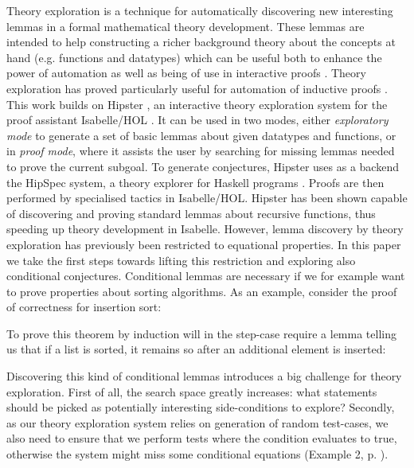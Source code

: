 \label{sec:intro}

Theory exploration is a technique for automatically discovering new interesting lemmas in a formal mathematical theory development.
%
These lemmas are intended to help constructing a richer background theory about the concepts at hand (e.g. functions and datatypes) which can be useful both to enhance the power of automation as well as being of use in interactive proofs \cite{mathsaid,isacosy,isascheme}.
%
Theory exploration has proved particularly useful for automation of inductive proofs \cite{hipspecCADE}. This work builds on Hipster \cite{hipster}, an interactive theory exploration system for the proof assistant Isabelle/HOL \cite{isabelle}.
%
It can be used in two modes, either \emph{exploratory mode} to generate a set of basic lemmas about given datatypes and functions, or in \emph{proof mode}, where it assists the user by searching for missing lemmas needed to prove the current subgoal.
%
To generate conjectures, Hipster uses as a backend the HipSpec system, a theory explorer for Haskell programs \cite{hipspecCADE}.
%
Proofs are then performed by specialised tactics in Isabelle/HOL. Hipster has been shown capable of discovering and proving standard lemmas about recursive functions, thus speeding up theory development in Isabelle.
%
However, lemma discovery by theory exploration has previously been restricted to equational properties.
%
In this paper we take the first steps towards lifting this restriction and exploring also conditional conjectures.
%
Conditional lemmas are necessary if we for example want to prove properties about sorting algorithms.
%
As an example, consider the proof of correctness for insertion sort:
%
\begin{center}
\end{center}
%
To prove this theorem by induction will in the step-case require a lemma telling us that if a list is sorted, it remains so after an additional element is inserted:
%
\begin{center}		
\end{center}
%
Discovering this kind of conditional lemmas introduces a big challenge for theory exploration.
%
First of all, the search space greatly increases: what statements should be picked as potentially interesting side-conditions to explore?
%
Secondly, as our theory exploration system relies on generation of random test-cases, we also need to ensure that we perform tests where the condition evaluates to true, otherwise the system might miss some conditional equations (Example 2, p. \pageref{example2}).

